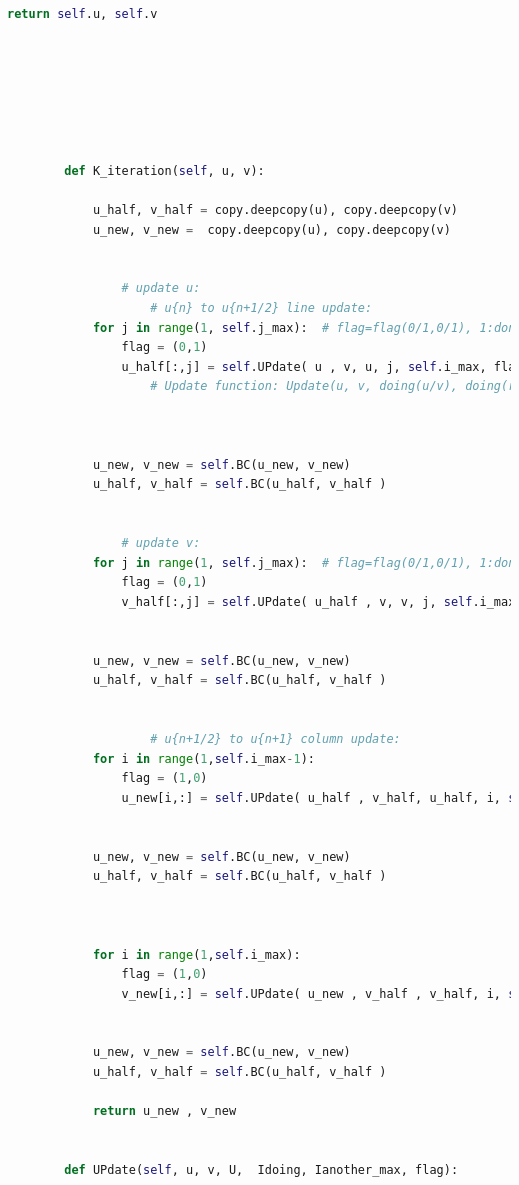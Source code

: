 \documentclass[12pt]{article}
\begin{document}
\begin{scriptsize}
\begin{lstlisting}[language=python,caption={Extended Region using ADI Solver}]
            return self.u, self.v
                     
    
    
    
    
    
    
        def K_iteration(self, u, v):
    
            u_half, v_half = copy.deepcopy(u), copy.deepcopy(v)
            u_new, v_new =  copy.deepcopy(u), copy.deepcopy(v)
    
    
                # update u:
                    # u{n} to u{n+1/2} line update:
            for j in range(1, self.j_max):  # flag=flag(0/1,0/1), 1:donig 0:other
                flag = (0,1)
                u_half[:,j] = self.UPdate( u , v, u, j, self.i_max, flag)
                    # Update function: Update(u, v, doing(u/v), doing(row=j/column=i), doingAnother, flag)
                
    
    
            u_new, v_new = self.BC(u_new, v_new)
            u_half, v_half = self.BC(u_half, v_half )
                
            
                # update v:
            for j in range(1, self.j_max):  # flag=flag(0/1,0/1), 1:donig 0:other
                flag = (0,1)
                v_half[:,j] = self.UPdate( u_half , v, v, j, self.i_max, flag)
            
    
            u_new, v_new = self.BC(u_new, v_new)
            u_half, v_half = self.BC(u_half, v_half )
    
                    
                    # u{n+1/2} to u{n+1} column update:
            for i in range(1,self.i_max-1):
                flag = (1,0)
                u_new[i,:] = self.UPdate( u_half , v_half, u_half, i, self.j_max, flag)
            
    
            u_new, v_new = self.BC(u_new, v_new)
            u_half, v_half = self.BC(u_half, v_half )
                
    
    
            for i in range(1,self.i_max):
                flag = (1,0)
                v_new[i,:] = self.UPdate( u_new , v_half , v_half, i, self.j_max, flag)
            
    
            u_new, v_new = self.BC(u_new, v_new)
            u_half, v_half = self.BC(u_half, v_half )
    
            return u_new , v_new
       
    
        def UPdate(self, u, v, U,  Idoing, Ianother_max, flag):
    

\end{lstlisting}
\end{scriptsize}
\end{document}
